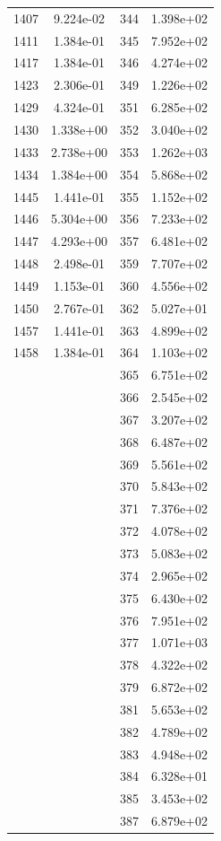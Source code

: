 \documentclass[12pt]{article}
\begin{document}
\begin{longtable}{@{}cccc@{}}
1407 & 9.224e-02 & 344 & 1.398e+02 \\
1411 & 1.384e-01 & 345 & 7.952e+02 \\
1417 & 1.384e-01 & 346 & 4.274e+02 \\
1423 & 2.306e-01 & 349 & 1.226e+02 \\
1429 & 4.324e-01 & 351 & 6.285e+02 \\
1430 & 1.338e+00 & 352 & 3.040e+02 \\
1433 & 2.738e+00 & 353 & 1.262e+03 \\
1434 & 1.384e+00 & 354 & 5.868e+02 \\
1445 & 1.441e-01 & 355 & 1.152e+02 \\
1446 & 5.304e+00 & 356 & 7.233e+02 \\
1447 & 4.293e+00 & 357 & 6.481e+02 \\
1448 & 2.498e-01 & 359 & 7.707e+02 \\
1449 & 1.153e-01 & 360 & 4.556e+02 \\
1450 & 2.767e-01 & 362 & 5.027e+01 \\
1457 & 1.441e-01 & 363 & 4.899e+02 \\
1458 & 1.384e-01 & 364 & 1.103e+02 \\
 &  & 365 & 6.751e+02 \\
 &  & 366 & 2.545e+02 \\
 &  & 367 & 3.207e+02 \\
 &  & 368 & 6.487e+02 \\
 &  & 369 & 5.561e+02 \\
 &  & 370 & 5.843e+02 \\
 &  & 371 & 7.376e+02 \\
 &  & 372 & 4.078e+02 \\
 &  & 373 & 5.083e+02 \\
 &  & 374 & 2.965e+02 \\
 &  & 375 & 6.430e+02 \\
 &  & 376 & 7.951e+02 \\
 &  & 377 & 1.071e+03 \\
 &  & 378 & 4.322e+02 \\
 &  & 379 & 6.872e+02 \\
 &  & 381 & 5.653e+02 \\
 &  & 382 & 4.789e+02 \\
 &  & 383 & 4.948e+02 \\
 &  & 384 & 6.328e+01 \\
 &  & 385 & 3.453e+02 \\
 &  & 387 & 6.879e+02 \\

\end{longtable}
\end{document}
